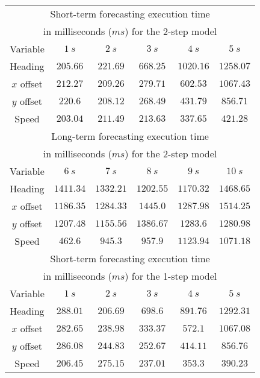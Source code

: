 \documentclass[preprint,12pt]{elsarticle}
\begin{document}
\begin{table}[!ht]
	\centering
	\begin{tabular}{|c|c|c|c|c|c|}
        \hline
        \multicolumn{6}{|c|}{Short-term forecasting execution time} \\
        \multicolumn{6}{|c|}{in milliseconds ($ms$) for the 2-step model} \\ \hline
        Variable & $1 \ s$ & $2 \ s$ & $3 \ s$ & $4 \ s$ & $5 \ s$ \\ \hline
        Heading & $205.66$ & $221.69$ & $668.25$ & $1020.16$ & $1258.07$ \\ \hline
        $x$ offset & $212.27$ & $209.26$ & $279.71$ & $602.53$ & $1067.43$ \\ \hline
        $y$ offset & $220.6$ & $208.12$ & $268.49$ & $431.79$ & $856.71$ \\ \hline
        Speed & $203.04$ & $211.49$ & $213.63$ & $337.65$ & $421.28$ \\ \hline
        \multicolumn{6}{|c|}{Long-term forecasting execution time} \\
        \multicolumn{6}{|c|}{in milliseconds ($ms$) for the 2-step model} \\ \hline
        Variable & $6 \ s$ & $7 \ s$ & $8 \ s$ & $9 \ s$ & $10 \ s$ \\ \hline
        Heading & $1411.34$ & $1332.21$ & $1202.55$ & $1170.32$ & $1468.65$ \\ \hline
        $x$ offset & $1186.35$ & $1284.33$ & $1445.0$ & $1287.98$ & $1514.25$ \\ \hline
        $y$ offset & $1207.48$ & $1155.56$ & $1386.67$ & $1283.6$ & $1280.98$ \\ \hline
        Speed & $462.6$ & $945.3$ & $957.9$ & $1123.94$ & $1071.18$ \\ \hline
        \multicolumn{6}{|c|}{Short-term forecasting execution time} \\
        \multicolumn{6}{|c|}{in milliseconds ($ms$) for the 1-step model} \\ \hline
        Variable & $1 \ s$ & $2 \ s$ & $3 \ s$ & $4 \ s$ & $5 \ s$ \\ \hline
        Heading & $288.01$ & $206.69$ & $698.6$ & $891.76$ & $1292.31$ \\ \hline
        $x$ offset & $282.65$ & $238.98$ & $333.37$ & $572.1$ & $1067.08$ \\ \hline
        $y$ offset & $286.08$ & $244.83$ & $252.67$ & $414.11$ & $856.76$ \\ \hline
        Speed & $206.45$ & $275.15$ & $237.01$ & $353.3$ & $390.23$ \\ \hline

\end{tabular}
\end{table}
\end{document}
